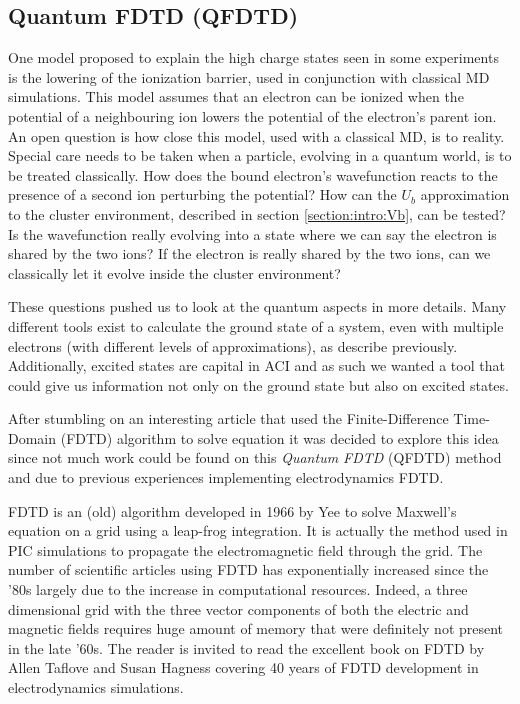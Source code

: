 \subsection{Quantum FDTD (QFDTD)}
\label{section:tools:qfdtd}


One model proposed to explain the high charge states seen in some experiments
is the lowering of the ionization barrier, used in conjunction with classical
MD simulations. This model assumes that an electron can be ionized when
the potential of a neighbouring ion lowers the potential of the electron's
parent ion. An open question is how close this model, used
with a classical MD, is to reality. Special care needs to be taken when a
particle, evolving in a quantum world, is to be treated classically.
How does
the bound electron's wavefunction reacts to the presence of a second ion
perturbing the potential? How can the $U_b$ approximation to the cluster
environment, described in section \ref{section:intro:Vb}, can be tested?
Is the wavefunction really evolving into a state
where we can say the electron is shared by the two ions? If the electron is
really shared by the two ions, can we classically let it evolve inside the
cluster environment?

These questions pushed us to look at the quantum aspects in more details. Many
different tools exist to calculate the ground state of a system, even with
multiple electrons (with different levels of approximations),
as describe previously. Additionally, excited states are
capital in ACI and as such we wanted a tool that could give us information not
only on the ground state but also on excited states.

After stumbling on an interesting article that used the Finite-Difference
Time-Domain (FDTD) algorithm to solve \schrodinger equation\cite{Sudiarta2007}
it was decided to explore this idea since not much work could be found on this
\textit{Quantum FDTD} (QFDTD) method and due to previous experiences
implementing electrodynamics FDTD.

FDTD is an (old) algorithm developed in 1966 by Yee\cite{Yee1966} to solve
Maxwell's equation on a grid using a leap-frog integration.
It is actually the method used in PIC simulations to propagate the electromagnetic
field through the grid.
The number of
scientific articles using FDTD has exponentially increased since the '80s
largely due to the increase in computational resources. Indeed, a three
dimensional grid with the three vector components of both the electric and
magnetic fields requires huge amount of memory that were definitely not present
in the late '60s. The reader is invited to read the excellent book on FDTD by
Allen Taflove and Susan Hagness\cite{Taflove2005} covering 40 years of FDTD
development in electrodynamics simulations.

